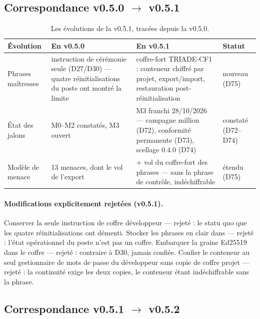\subsection{Correspondance v0.5.0 $\to$ v0.5.1}\label{sec:evolutions051}

\begin{table}[htbp]
\centering\small
\caption{Les évolutions de la v0.5.1, tracées depuis la v0.5.0.}
\label{tab:correspondance051}
\begin{tabularx}{\textwidth}{@{}l Y Y l@{}}
\toprule
\textbf{Évolution} & \textbf{En v0.5.0} & \textbf{En v0.5.1} & \textbf{Statut} \\
\midrule
Phrases maîtresses & instruction de cérémonie seule (D27/D30) — quatre
réinitialisations du poste ont montré la limite & coffre-fort TRIADE-CF1 : conteneur
chiffré par projet, export/import, restauration post-réinitialisation & nouveau (D75) \\
État des jalons & M0–M2 constatés, M3 ouvert & M3 franchi 28/10/2026 — campagne
million (D72), conformité permanente (D73), scellage 0.4.0 (D74) & constaté (D72–D74) \\
Modèle de menace & 13 menaces, dont le vol de l'export & + vol du coffre-fort des
phrases — sans la phrase de contrôle, indéchiffrable & étendu (D75) \\
\bottomrule
\end{tabularx}
\end{table}

\paragraph{Modifications explicitement rejetées (v0.5.1).} Conserver la seule
instruction de coffre développeur — rejeté : le statu quo que les quatre réinitialisations
ont démenti. Stocker les phrases en clair dans  — rejeté : l'état
opérationnel du poste n'est pas un coffre. Embarquer la graine Ed25519 dans le coffre —
rejeté : contraire à D30, jamais confiée. Confier le conteneur au seul gestionnaire de
mots de passe du développeur sans copie de coffre projet — rejeté : la continuité exige
les deux copies, le conteneur étant indéchiffrable sans la phrase.

\subsection{Correspondance v0.5.1 $\to$ v0.5.2}\label{sec:evolutions052}

